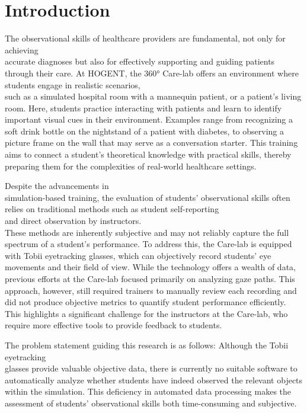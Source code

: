 \documentclass[english]{hogent-article}
\begin{document}
\section{Introduction}
\label{sec:Introduction}

The observational skills of healthcare providers are fundamental, not only for achieving\\ accurate diagnoses but also for effectively supporting and guiding patients through their care.
At HOGENT, the 360° Care-lab offers an environment where students engage in realistic scenarios,\\ such as a simulated hospital room with a mannequin patient, or a patient's living room.
Here, students practice interacting with patients and learn to identify important visual cues in their environment.
Examples range from recognizing a soft drink bottle on the nightstand of a patient with diabetes, to observing a picture frame on the wall that may serve as a conversation starter.
This training aims to connect a student's theoretical knowledge with practical skills, thereby preparing them for the complexities of real-world healthcare settings.

Despite the advancements in\\ simulation-based training, the evaluation of students' observational skills often relies on traditional methods such as student self-reporting\\ and direct observation by instructors.\\
These methods are inherently subjective and may not reliably capture the full spectrum of a student's performance.
To address this, the Care-lab is equipped with Tobii eyetracking glasses, which can objectively record students' eye movements and their field of view. 
While the technology offers a wealth of data, previous efforts at the Care-lab focused primarily on analyzing gaze paths.
This approach, however, still required trainers to manually review each recording and did not produce objective metrics to quantify student performance efficiently.
This highlights a significant challenge for the instructors at the Care-lab, who require more effective tools to provide feedback to students.

The problem statement guiding this research is as follows: Although the Tobii eyetracking\\ glasses provide valuable objective data, there is currently no suitable software to automatically analyze whether
students have indeed observed the relevant objects within the simulation. This deficiency in automated data processing makes the assessment of students' observational skills both time-consuming and subjective.
\end{document}
